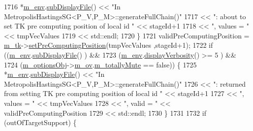 \begin{DoxyCode}
1716             *\hyperlink{class_q_u_e_s_o_1_1_metropolis_hastings_s_g_ac8ea061e55b920e0c8f9bce5c3f20e52}{m\_env}.\hyperlink{class_q_u_e_s_o_1_1_base_environment_a8a0064746ae8dddfece4229b9ad374d6}{subDisplayFile}() << \textcolor{stringliteral}{"In
       MetropolisHastingsSG<P\_V,P\_M>::generateFullChain()"}
1717                                     << \textcolor{stringliteral}{": about to set TK pre computing position of local id "} << stageId+1
1718                                     << \textcolor{stringliteral}{", values = "} << tmpVecValues
1719                                     << std::endl;
1720           \}
1721           validPreComputingPosition = \hyperlink{class_q_u_e_s_o_1_1_metropolis_hastings_s_g_a26e9680abddfb793486c995fa16f8c2d}{m\_tk}->\hyperlink{class_q_u_e_s_o_1_1_base_t_k_group_acd1efb5b2ae3eb4f1130fa37201545d8}{setPreComputingPosition}(tmpVecValues
      ,stageId+1);
1722           \textcolor{keywordflow}{if} ((\hyperlink{class_q_u_e_s_o_1_1_metropolis_hastings_s_g_ac8ea061e55b920e0c8f9bce5c3f20e52}{m\_env}.\hyperlink{class_q_u_e_s_o_1_1_base_environment_a8a0064746ae8dddfece4229b9ad374d6}{subDisplayFile}()                   ) &&
1723               (\hyperlink{class_q_u_e_s_o_1_1_metropolis_hastings_s_g_ac8ea061e55b920e0c8f9bce5c3f20e52}{m\_env}.\hyperlink{class_q_u_e_s_o_1_1_base_environment_a1fe5f244fc0316a0ab3e37463f108b96}{displayVerbosity}() >= 5            ) &&
1724               (\hyperlink{class_q_u_e_s_o_1_1_metropolis_hastings_s_g_a5d0bc9f73d50d272aa6bfb5ef5939ef3}{m\_optionsObj}->\hyperlink{class_q_u_e_s_o_1_1_metropolis_hastings_s_g_options_a9d4792d9fc2dc5439b8ab489b0c236eb}{m\_ov}.\hyperlink{class_q_u_e_s_o_1_1_mh_options_values_af812309e81191e88dfdc87c5815141a3}{m\_totallyMute} == \textcolor{keyword}{false})) \{
1725             *\hyperlink{class_q_u_e_s_o_1_1_metropolis_hastings_s_g_ac8ea061e55b920e0c8f9bce5c3f20e52}{m\_env}.\hyperlink{class_q_u_e_s_o_1_1_base_environment_a8a0064746ae8dddfece4229b9ad374d6}{subDisplayFile}() << \textcolor{stringliteral}{"In
       MetropolisHastingsSG<P\_V,P\_M>::generateFullChain()"}
1726                                     << \textcolor{stringliteral}{": returned from setting TK pre computing position of local id "} << 
      stageId+1
1727                                     << \textcolor{stringliteral}{", values = "} << tmpVecValues
1728                                     << \textcolor{stringliteral}{", valid = "}  << validPreComputingPosition
1729                                     << std::endl;
1730           \}
1731 
1732           \textcolor{keywordflow}{if} (outOfTargetSupport) \{

\end{DoxyCode}
